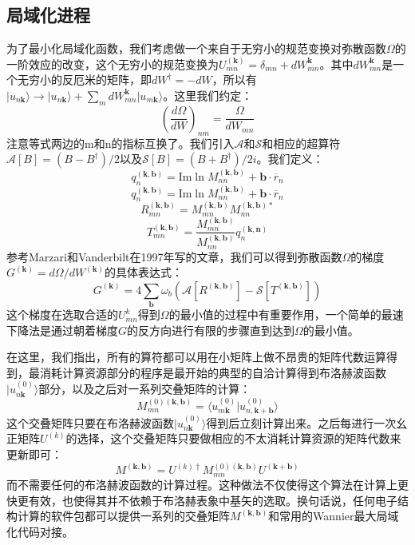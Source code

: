 \subsection{局域化进程}
为了最小化局域化函数，我们考虑做一个来自于无穷小的规范变换对弥散函数$\Omega$的一阶效应的改变，这个无穷小的规范变换为$U^{(\bm{k})}_{mn}=\delta_{mn}+dW_{mn}^{\bm{k}}$。其中$dW_{mn}^{\bm{k}}$是一个无穷小的反厄米的矩阵，即$dW^\dagger=-dW$，所以有$|u_{n\bm{k}}\rangle\rightarrow |u_{n\bm{k}}\rangle+\sum_mdW_{mn}^{\bm{k}}|u_{m\bm{k}}\rangle$。这里我们约定：
\begin{equation}
(\frac{d\Omega}{dW})_{nm}=\frac{\Omega}{dW_{mn}}
\end{equation}
注意等式两边的m和n的指标互换了。我们引入$\mathcal{A}$和$\mathcal{S}$和相应的超算符 $\mathcal{A}[B]=(B-B^\dagger)/2$以及$\mathcal{S}[B]=(B+B^\dagger)/2i$。我们定义：
\begin{equation}
q^{(\bm{k},\bm{b})}_n=\text{Im} \ln M^{(\bm{k},\bm{b})}_{nn}+\bm{b} \cdot \overline r_n
\end{equation}
\begin{equation}
q^{(\bm{k},\bm{b})}_n=\text{Im} \ln M^{(\bm{k},\bm{b})}_{nn}+\bm{b} \cdot \overline r_n
\end{equation}
\begin{equation}
R^{(\bm{k},\bm{b})}_{mn}= M^{(\bm{k},\bm{b})}_{mn}M^{(\bm{k},\bm{b})\ast}_{nn}
\end{equation}
\begin{equation}
T^{(\bm{k},\bm{b})}_{mn}= \frac{M^{(\bm{k},\bm{b})}_{mn}}{M^{(\bm{k},\bm{b})}_{nn}}q^{(\bm{k},\bm{n})}_n
\end{equation}
参考Marzari和Vanderbilt在1997年写的文章，我们可以得到弥散函数$\Omega$的梯度$G^{(\bm{k})}=d\Omega /dW^{(\bm{k})}$的具体表达式：
\begin{equation}
G^{(\bm{k})}=4\sum_{\bm{b}}\omega_b(\mathcal{A}[R^{(\bm{k},\bm{b})}]-\mathcal{S}[T^{(\bm{k},\bm{b})}])
\end{equation}
这个梯度在选取合适的$U_{mn}^{k}$得到$\Omega$的最小值的过程中有重要作用，一个简单的最速下降法是通过朝着梯度$G$的反方向进行有限的步骤直到达到$\Omega$的最小值。

在这里，我们指出，所有的算符都可以用在小矩阵上做不昂贵的矩阵代数运算得到，最消耗计算资源部分的程序是最开始的典型的自洽计算得到布洛赫波函数$|u^{(0)}_{n\bm{k}}\rangle$部分，以及之后对一系列交叠矩阵的计算：
\begin{equation}
M_{mn}^{(0)(\bm{k},\bm{b})}=\langle u_{m\bm{k}}^{(0)}|u^{(0)}_{n,\bm{k+b}}\rangle
\end{equation}
这个交叠矩阵只要在布洛赫波函数$|u^{(0)}_{n\bm{k}}\rangle$得到后立刻计算出来。之后每进行一次幺正矩阵$U^{(k)}$的选择，这个交叠矩阵只要做相应的不太消耗计算资源的矩阵代数来更新即可：
\begin{equation}
M^{(\bm{k},\bm{b})}=U^{(k)\dagger}M_{mn}^{(0)(\bm{k},\bm{b})}U^{\bm{(k+b)}}
\end{equation}
而不需要任何的布洛赫波函数的计算过程。这种做法不仅使得这个算法在计算上更快更有效，也使得其并不依赖于布洛赫表象中基矢的选取。换句话说，任何电子结构计算的软件包都可以提供一系列的交叠矩阵$M^{(\bm{k},\bm{b})}$和常用的Wannier最大局域化代码对接。
